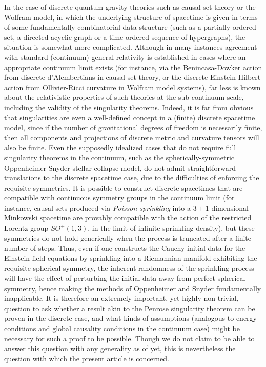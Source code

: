 \documentclass{article}
\begin{document}
In the case of discrete quantum gravity theories such as causal set theory\cite{bombelli}\cite{bombelli2}\cite{sorkin}\cite{sorkin2} or the Wolfram model\cite{wolfram}\cite{wolfram2}\cite{gorard}\cite{gorard2}, in which the underlying structure of spacetime is given in terms of some fundamentally combinatorial data structure (such as a partially ordered set, a directed acyclic graph or a time-ordered sequence of hypergraphs), the situation is somewhat more complicated. Although in many instances agreement with standard (continuum) general relativity is established in cases where an appropriate continuum limit exists (for instance, via the Benincasa-Dowker action from discrete d'Alembertians in causal set theory\cite{benincasa}, or the discrete Einstein-Hilbert action from Ollivier-Ricci curvature in Wolfram model systems\cite{gorard}\cite{gorard3}\cite{gorard4}), far less is known about the relativistic properties of such theories at the sub-continuum scale, including the validity of the singularity theorems. Indeed, it is far from obvious that singularities are even a well-defined concept in a (finite) discrete spacetime model, since if the number of gravitational degrees of freedom is necessarily finite, then all components and projections of discrete metric and curvature tensors will also be finite. Even the supposedly idealized cases that do not require full singularity theorems in the continuum, such as the spherically-symmetric Oppenheimer-Snyder stellar collapse model, do not admit straightforward translations to the discrete spacetime case, due to the difficulties of enforcing the requisite symmetries. It is possible to construct discrete spacetimes that are compatible with continuous symmetry groups in the continuum limit (for instance, causal sets produced via \textit{Poisson sprinkling} into a ${3 + 1}$-dimensional Minkowski spacetime are provably compatible with the action of the restricted Lorentz group ${SO^{+} \left( 1, 3 \right)}$, in the limit of infinite sprinkling density\cite{bombelli3}), but these symmetries do not hold generically when the process is truncated after a finite number of steps. Thus, even if one constructs the Cauchy initial data for the Einstein field equations by sprinkling into a Riemannian manifold exhibiting the requisite spherical symmetry, the inherent randomness of the sprinkling process will have the effect of perturbing the initial data away from perfect spherical symmetry, hence making the methods of Oppenheimer and Snyder fundamentally inapplicable. It is therefore an extremely important, yet highly non-trivial, question to ask whether a result akin to the Penrose singularity theorem can be proven in the discrete case, and what kinds of assumptions (analogous to energy conditions and global causality conditions in the continuum case) might be necessary for such a proof to be possible. Though we do not claim to be able to answer this question with any generality as of yet, this is nevertheless the question with which the present article is concerned.
\end{document}
